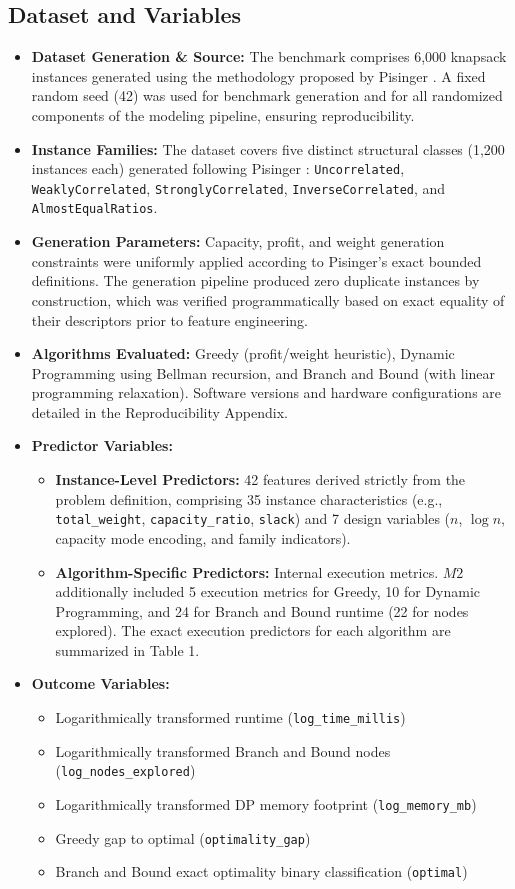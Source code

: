 \documentclass[11pt,a4paper]{article}
\begin{document}
\subsection{Dataset and Variables}
\begin{itemize}
  \item \textbf{Dataset Generation \& Source:} The benchmark comprises 6,000 knapsack instances generated using the methodology proposed by Pisinger \cite{Pisinger2005}. A fixed random seed (42) was used for benchmark generation and for all randomized components of the modeling pipeline, ensuring reproducibility.
  \item \textbf{Instance Families:} The dataset covers five distinct structural classes (1,200 instances each) generated following Pisinger \cite{Pisinger2005}: \texttt{Uncorrelated}, \texttt{WeaklyCorrelated}, \texttt{StronglyCorrelated}, \texttt{InverseCorrelated}, and \texttt{AlmostEqualRatios}.
  \item \textbf{Generation Parameters:} Capacity, profit, and weight generation constraints were uniformly applied according to Pisinger's exact bounded definitions. The generation pipeline produced zero duplicate instances by construction, which was verified programmatically based on exact equality of their descriptors prior to feature engineering.
  \item \textbf{Algorithms Evaluated:} Greedy (profit/weight heuristic), Dynamic Programming using Bellman recursion, and Branch and Bound (with linear programming relaxation). Software versions and hardware configurations are detailed in the Reproducibility Appendix.
  \item \textbf{Predictor Variables:}
\begin{itemize}
  \item \textbf{Instance-Level Predictors:} 42 features derived strictly from the problem definition, comprising 35 instance characteristics (e.g., \texttt{total\_weight}, \texttt{capacity\_ratio}, \texttt{slack}) and 7 design variables ($n$, $\log n$, capacity mode encoding, and family indicators).
  \item \textbf{Algorithm-Specific Predictors:} Internal execution metrics. $M2$ additionally included 5 execution metrics for Greedy, 10 for Dynamic Programming, and 24 for Branch and Bound runtime (22 for nodes explored). The exact execution predictors for each algorithm are summarized in Table 1.
\end{itemize}
  \item \textbf{Outcome Variables:}
\begin{itemize}
  \item Logarithmically transformed runtime (\texttt{log\_time\_millis})
  \item Logarithmically transformed Branch and Bound nodes (\texttt{log\_nodes\_explored})
  \item Logarithmically transformed DP memory footprint (\texttt{log\_memory\_mb})
  \item Greedy gap to optimal (\texttt{optimality\_gap})
  \item Branch and Bound exact optimality binary classification (\texttt{optimal})
\end{itemize}
\end{itemize}
\end{document}
